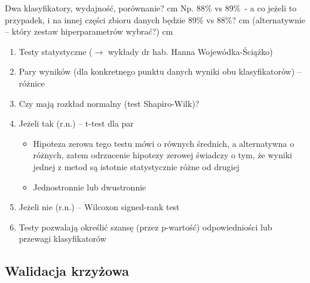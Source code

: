 \documentclass[11pt, xcolor={dvipsnames,svgnames},aspectratio=169]{beamer}
\theoremstyle{plain}
\theoremstyle{plain}
\begin{document}
\begin{frame}
	Dwa klasyfikatory, wydajność, porównanie?\pause{} cm
	Np. 88\% vs 89\%\pause\ - a co jeżeli to przypadek, i na innej części zbioru danych będzie 89\% vs 88\%?\pause{} cm
	(alternatywnie -- który zestaw hiperparametrów wybrać?)\pause{} cm
	\begin{enumerate}
		\item Testy statystyczne ($\rightarrow$ wykłady dr hab. Hanna Wojewódka-Ściążko)\pause
		\item Pary wyników (dla konkretnego punktu danych wyniki obu klasyfikatorów) -- różnice\pause
		\item Czy mają rozkład normalny (test Shapiro-Wilk)?\pause
		\item Jeżeli tak (r.n.) -- t-test dla par
			\begin{itemize}
				\item Hipoteza zerowa tego testu mówi o równych średnich, a alternatywna o
				różnych, zatem odrzucenie hipotezy zerowej świadczy o tym, że wyniki jednej
				z metod są istotnie statystycznie różne od drugiej
				\item Jednostronnie lub dwustronnie
			\end{itemize}
		\item Jeżeli nie (r.n.) -- Wilcoxon signed-rank test\pause
		\item Testy pozwalają określić szansę (przez p-wartość) odpowiedniości lub przewagi klasyfikatorów
	\end{enumerate}
\end{frame}

\subsection{Walidacja krzyżowa}
\end{document}
